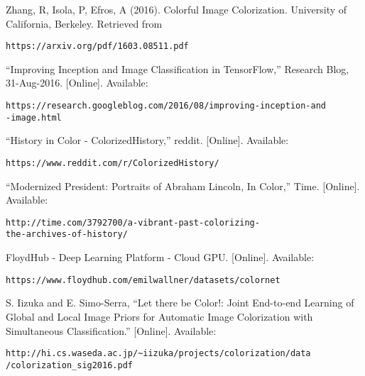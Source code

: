 \documentclass{article} %
\begin{document}
\begin{thebibliography}{8}

Zhang, R, Isola, P, Efros, A (2016). Colorful Image Colorization. University of California, Berkeley. Retrieved from \begin{verbatim}https://arxiv.org/pdf/1603.08511.pdf\end{verbatim}

“Improving Inception and Image Classification in TensorFlow,” Research Blog, 31-Aug-2016. [Online]. Available: \begin{verbatim}https://research.googleblog.com/2016/08/improving-inception-and
-image.html\end{verbatim}

“History in Color - ColorizedHistory,” reddit. [Online]. Available: \begin{verbatim}https://www.reddit.com/r/ColorizedHistory/\end{verbatim}

“Modernized President: Portraits of Abraham Lincoln, In Color,” Time. [Online]. Available: \begin{verbatim}http://time.com/3792700/a-vibrant-past-colorizing-
the-archives-of-history/\end{verbatim}

FloydHub - Deep Learning Platform - Cloud GPU. [Online]. Available: \begin{verbatim}https://www.floydhub.com/emilwallner/datasets/colornet\end{verbatim}

S. Iizuka and E. Simo-Serra, “Let there be Color!: Joint End-to-end Learning of Global and Local Image Priors for Automatic Image Colorization with Simultaneous Classification.” [Online]. Available: \begin{verbatim}http://hi.cs.waseda.ac.jp/~iizuka/projects/colorization/data
/colorization_sig2016.pdf\end{verbatim}



\end{thebibliography}
\end{document}
